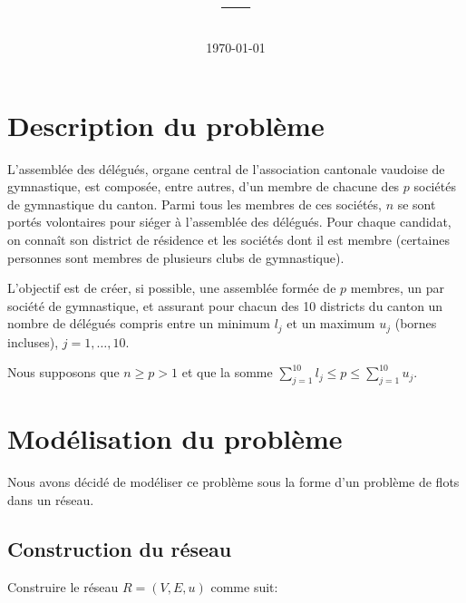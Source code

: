 \documentclass[11pt, a4paper]{article}
\title{\vspace{-2.25cm}\hSchool{} --- \hClass\\\textbf{\hFile{}  \hFileType}\vspace{-0.45cm}}
\date{\vspace{-0.35cm}\today\\\vspace{-0.5cm}}
\author{\hAuthorsFancy}
\begin{document}
\maketitle

\section{Description du problème}
L’assemblée des délégués, organe central de l’association cantonale vaudoise de gymnastique, est composée, entre autres, d’un membre de chacune des $p$ sociétés de gymnastique du canton. Parmi tous les membres de ces sociétés, $n$ se sont portés volontaires pour siéger à l’assemblée des délégués. Pour chaque candidat, on connaît son district de résidence et les sociétés dont il est membre (certaines personnes sont membres de plusieurs clubs de gymnastique). 

L'objectif est de créer, si possible, une assemblée formée de $p$ membres, un par société de gymnastique, et assurant pour chacun des 10 districts du canton un nombre de délégués compris entre un minimum $l_j$ et un maximum $u_j$ (bornes incluses), $j = 1, \ldots, 10$.

Nous supposons que $n \geq p > 1$ et que la somme $\sum_{j=1}^{10} l_j \leq p \leq \sum_{j=1}^{10} u_j$.

\section{Modélisation du problème}
Nous avons décidé de modéliser ce problème sous la forme d’un problème de flots dans un réseau.

\subsection{Construction du réseau}

Construire le réseau $R = (V, E, u)$  comme suit:
\end{document}

